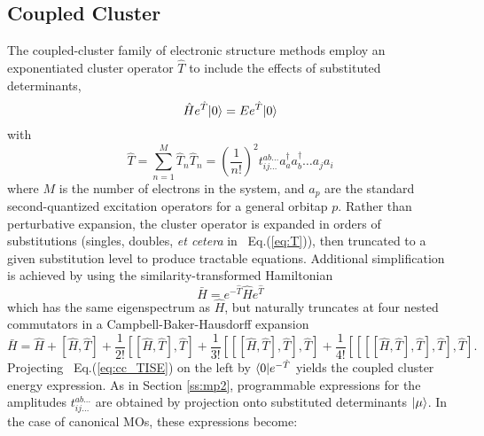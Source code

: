 \subsection{Coupled Cluster} \label{ss:cc}
The coupled-cluster family of electronic structure methods
\cite{Sinanoglu1964,Cizek1966,Sinanoglu1964,Crawford2000}
employ an exponentiated cluster operator $\hat{T}$ to include the effects of substituted determinants,
\begin{equation} \label{eq:cc_TISE}
    \hat{H}e^{\hat{T}}| 0 \rangle = Ee^{\hat{T}}| 0 \rangle
\end{equation}
with
\begin{subequations}
    \begin{equation} \label{eq:T}
        \hat{T} = \sum_{n=1}^M\hat{T}_n
    \end{equation}
    \begin{equation} \label{eq:T_n}
        \hat{T}_n = \left(\frac{1}{n!}\right)^2 t_{ij\ldots}^{ab\ldots}a_a^{\dagger}a_b^{\dagger}\ldots a_j a_i
    \end{equation}
\end{subequations}
where $M$ is the number of electrons in the system, and $a_p$ are the standard second-quantized 
excitation operators for a general orbitap $p$.
Rather than perturbative expansion, the cluster operator is expanded in orders of substitutions 
(singles, doubles, \textit{et cetera} in ~Eq.(\ref{eq:T})), then truncated to a given substitution 
level to produce tractable equations. Additional simplification is achieved by using the 
similarity-transformed Hamiltonian
\begin{equation} \label{eq:Hbar}
    \bar{H} = e^{-\hat{T}}\hat{H}e^{\hat{T}}
\end{equation}
which has the same eigenspectrum as $\hat{H}$, but naturally truncates at four nested commutators in a Campbell-Baker-Hausdorff expansion
\begin{equation} \label{eq:cbh}
    \bar{H} = \hat{H} + [\hat{H}, \hat{T}] + \frac{1}{2!}[[\hat{H}, \hat{T}], \hat{T}] + \frac{1}{3!}[[[\hat{H}, \hat{T}], \hat{T}], \hat{T}] + \frac{1}{4!}[[[[\hat{H}, \hat{T}], \hat{T}], \hat{T}], \hat{T}].
\end{equation}
Projecting ~Eq.(\ref{eq:cc_TISE}) on the left by $\langle0 |e^{-\hat{T}}$ yields the coupled cluster 
energy expression. As in Section \ref{ss:mp2}, programmable expressions for the amplitudes 
$t_{ij\ldots}^{ab\ldots}$ are obtained by projection onto substituted determinants $| \mu \rangle$. 
In the case of canonical MOs, these expressions become:
